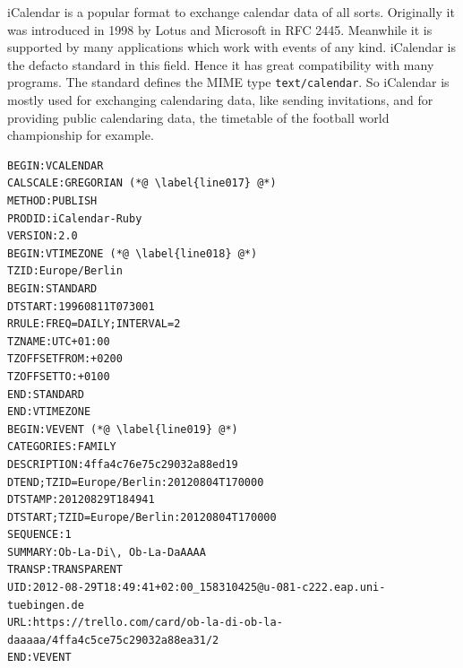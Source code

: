 iCalendar is a popular format to exchange calendar data of all sorts. Originally it was introduced in 1998 by Lotus and Microsoft in RFC 2445. \cite{rfc:2445} Meanwhile it is supported by many applications which work with events of any kind. iCalendar is the defacto standard in this field. Hence it has great compatibility with many programs.  The standard defines the MIME type \texttt{text/calendar}. So iCalendar is mostly used for exchanging calendaring data, like sending invitations, and for providing public calendaring data, the timetable of the football world championship for example.
\begin{lstlisting}[aboveskip=1\baselineskip, style=bash, caption=iCalendar example., label=listing023]
BEGIN:VCALENDAR
CALSCALE:GREGORIAN (*@ \label{line017} @*)
METHOD:PUBLISH
PRODID:iCalendar-Ruby
VERSION:2.0
BEGIN:VTIMEZONE (*@ \label{line018} @*)
TZID:Europe/Berlin
BEGIN:STANDARD
DTSTART:19960811T073001
RRULE:FREQ=DAILY;INTERVAL=2
TZNAME:UTC+01:00
TZOFFSETFROM:+0200
TZOFFSETTO:+0100
END:STANDARD
END:VTIMEZONE
BEGIN:VEVENT (*@ \label{line019} @*)
CATEGORIES:FAMILY
DESCRIPTION:4ffa4c76e75c29032a88ed19
DTEND;TZID=Europe/Berlin:20120804T170000
DTSTAMP:20120829T184941
DTSTART;TZID=Europe/Berlin:20120804T170000
SEQUENCE:1
SUMMARY:Ob-La-Di\, Ob-La-DaAAAA
TRANSP:TRANSPARENT
UID:2012-08-29T18:49:41+02:00_158310425@u-081-c222.eap.uni-tuebingen.de
URL:https://trello.com/card/ob-la-di-ob-la-daaaaa/4ffa4c5ce75c29032a88ea31/2
END:VEVENT
\end{lstlisting}

